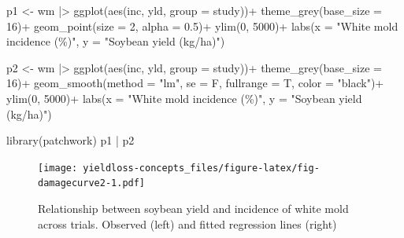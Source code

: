 \documentclass[
  letterpaper,
]{book}
\newenvironment{Shaded}{\begin{snugshade}}{\end{snugshade}}
\newcommand{\AttributeTok}[1]{\textcolor[rgb]{0.40,0.45,0.13}{#1}}
\newcommand{\DecValTok}[1]{\textcolor[rgb]{0.68,0.00,0.00}{#1}}
\newcommand{\FloatTok}[1]{\textcolor[rgb]{0.68,0.00,0.00}{#1}}
\newcommand{\FunctionTok}[1]{\textcolor[rgb]{0.28,0.35,0.67}{#1}}
\newcommand{\NormalTok}[1]{\textcolor[rgb]{0.00,0.23,0.31}{#1}}
\newcommand{\OtherTok}[1]{\textcolor[rgb]{0.00,0.23,0.31}{#1}}
\newcommand{\SpecialCharTok}[1]{\textcolor[rgb]{0.37,0.37,0.37}{#1}}
\newcommand{\StringTok}[1]{\textcolor[rgb]{0.13,0.47,0.30}{#1}}
\begin{document}
\begin{Shaded}
\begin{Highlighting}[]
\NormalTok{p1 }\OtherTok{\textless{}{-}}\NormalTok{ wm }\SpecialCharTok{|\textgreater{}} 
  \FunctionTok{ggplot}\NormalTok{(}\FunctionTok{aes}\NormalTok{(inc, yld, }\AttributeTok{group =}\NormalTok{ study))}\SpecialCharTok{+}
  \FunctionTok{theme\_grey}\NormalTok{(}\AttributeTok{base\_size =} \DecValTok{16}\NormalTok{)}\SpecialCharTok{+}
  \FunctionTok{geom\_point}\NormalTok{(}\AttributeTok{size =} \DecValTok{2}\NormalTok{, }\AttributeTok{alpha =} \FloatTok{0.5}\NormalTok{)}\SpecialCharTok{+}
  \FunctionTok{ylim}\NormalTok{(}\DecValTok{0}\NormalTok{, }\DecValTok{5000}\NormalTok{)}\SpecialCharTok{+}
  \FunctionTok{labs}\NormalTok{(}\AttributeTok{x =} \StringTok{"White mold incidence (\%)"}\NormalTok{,}
       \AttributeTok{y =} \StringTok{"Soybean yield (kg/ha)"}\NormalTok{)}

\NormalTok{p2 }\OtherTok{\textless{}{-}}\NormalTok{ wm }\SpecialCharTok{|\textgreater{}} 
  \FunctionTok{ggplot}\NormalTok{(}\FunctionTok{aes}\NormalTok{(inc, yld, }\AttributeTok{group =}\NormalTok{ study))}\SpecialCharTok{+}
  \FunctionTok{theme\_grey}\NormalTok{(}\AttributeTok{base\_size =} \DecValTok{16}\NormalTok{)}\SpecialCharTok{+}
  \FunctionTok{geom\_smooth}\NormalTok{(}\AttributeTok{method =} \StringTok{"lm"}\NormalTok{, }\AttributeTok{se =}\NormalTok{ F, }\AttributeTok{fullrange =}\NormalTok{ T, }\AttributeTok{color =} \StringTok{"black"}\NormalTok{)}\SpecialCharTok{+}
  \FunctionTok{ylim}\NormalTok{(}\DecValTok{0}\NormalTok{, }\DecValTok{5000}\NormalTok{)}\SpecialCharTok{+}
  \FunctionTok{labs}\NormalTok{(}\AttributeTok{x =} \StringTok{"White mold incidence (\%)"}\NormalTok{,}
       \AttributeTok{y =} \StringTok{"Soybean yield (kg/ha)"}\NormalTok{)}

\FunctionTok{library}\NormalTok{(patchwork)}
\NormalTok{p1 }\SpecialCharTok{|}\NormalTok{ p2}
\end{Highlighting}
\end{Shaded}

\begin{figure}

\texttt{[image: yieldloss-concepts\_files/figure-latex/fig-damagecurve2-1.pdf]} \hfill{}

\caption{\label{fig-damagecurve2}Relationship between soybean yield and
incidence of white mold across trials. Observed (left) and fitted
regression lines (right)}

\end{figure}
\end{document}

